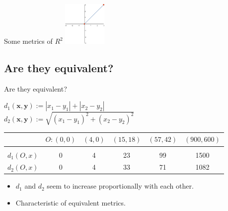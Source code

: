 \documentclass{beamer}
\begin{document}
\begin{frame}{Some metrics of $R^2$}
        \includegraphics[height=80]{graph1.pdf}

    \end{frame}

    \subsection{Are they equivalent?}
    \begin{frame}{Are they equivalent?}

        \begin{block}
            $d_1(\textbf{x},\textbf{y}) := |x_1 - y_1| + |x_2 - y_2|$ \\

            $d_2(\textbf{x},\textbf{y}) := \sqrt{(x_1 - y_1)^2 + (x_2 - y_2)^2}$
        \end{block}

        \begin{tabular}{r|c c c c c}
        & $O:(0,0)$ & $(4,0)$ & $(15,18)$ & $(57,42)$ & $(900,600)$ \\
        \hline \\
            $d_1(O,x)$ & 0 & 4 & 23 & 99 & 1500 \\
            $d_2(O,x)$ & 0 & 4 & 33 & 71 & 1082 \\
        \end{tabular}

        \pause

        \begin{itemize}
            \item $d_1$ and $d_2$ seem to increase proportionally with each other.\\
            \item Characteristic of equivalent metrics.
        \end{itemize}

    \end{frame}
\end{document}
